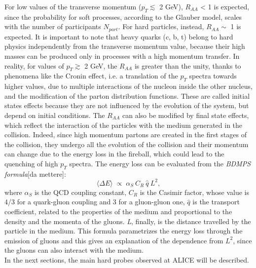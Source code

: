 For low values of the transverse momentum ($p_{T} \lesssim$ 2 GeV), $R_{AA}$ < 1 is expected, since the probability for soft processes, according to the Glauber model, scales with the number of participants $N_{part}$. For hard particles, instead, $R_{AA} \sim$ 1 is expected. It is important to note that heavy quarks (c, b, t) belong to hard physics independently from the transverse momentum value, because their high masses can be produced only in processes with a high momentum transfer. In reality, for values of $p_{T} \gtrsim$ 2 GeV, the $R_{AA}$ is greater than the unity, thanks to phenomena like the Cronin effect, i.e. a translation of the $p_{T}$ spectra towards higher values, due to multiple interactions of the nucleon inside the other nucleus, and the modification of the parton distribution functions. These are called initial states effects because they are not influenced by the evolution of the system, but depend on initial conditions. The $R_{AA}$ can also be modified by final state effects, which reflect the interaction of the particles with the medium generated in the collision. Indeed, since high momentum partons are created in the first stages of the collision, they undergo all the evolution of the collision and their momentum can change due to the energy loss in the fireball, which could lead to the quenching of high $p_{T}$ spectra. The energy loss can be evaluated from the \textit{BDMPS formula}[da mettere]:
\begin{equation}
 \langle \Delta E \rangle \;\propto\;\alpha_{S} \:C_{R}\: \hat{q}\: L^{2},
\end{equation}
where $\alpha_{S}$ is the QCD coupling constant, $C_{R}$ is the Casimir factor, whose value is 4/3 for a quark-gluon coupling and 3 for a gluon-gluon 
one, $\hat{q}$ is the transport coefficient, related to the properties of the medium and proportional to the density and the momenta of the gluons. \textit{L}, finally, is the distance travelled by the particle in the medium. This formula parametrizes the energy loss through the emission of gluons and this gives an explanation of the dependence from $L^{2}$, since the gluons can also interact with the medium.\\
In the next sections, the main hard probes observed at ALICE will be described.\\
%
